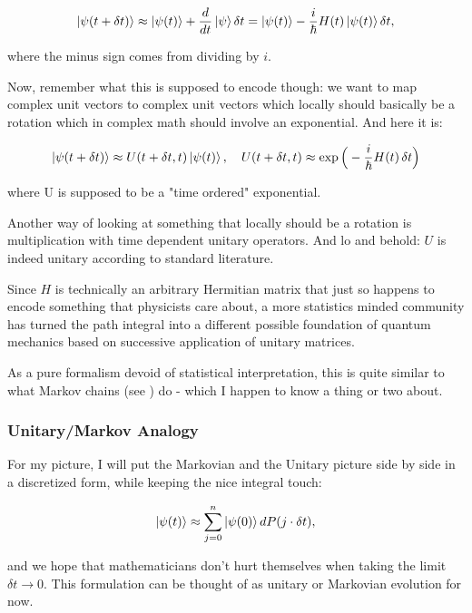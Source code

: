 \documentclass{article}
\begin{document}
\begin{align*}
\ket{\psi(t+\delta t)}\approx \ket{\psi(t)}+\frac{d}{dt}\ket{\psi}\delta t=\ket{\psi(t)}-\frac{i}{\hbar}H(t)\ket{\psi(t)}\delta t,
\end{align*}

where the minus sign comes from dividing by $i$.

Now, remember what this is supposed to encode though: we want to map complex unit vectors to complex unit vectors which locally should basically be a rotation which in complex math should involve an exponential. And here it is:

\begin{align*}
\ket{\psi(t+\delta t)} \approx U(t+\delta t, t) \ket{\psi(t)}, \quad
U(t+\delta t, t) \approx \exp\Big(-\frac{i}{\hbar} H(t)\, \delta t \Big)
\end{align*}

where U is supposed to be a "time ordered" exponential.

Another way of looking at something that locally should be a rotation is multiplication with time dependent unitary operators. And lo and behold: $U$ is indeed unitary according to standard literature.

Since $H$ is technically an arbitrary Hermitian matrix that just so happens to encode something that physicists care about, a more statistics minded community has turned the path integral into a different possible foundation \cite{Luty2007PathIntegrals} of quantum mechanics based on successive application of unitary matrices.

As a pure formalism devoid of statistical interpretation, this is quite similar to what Markov chains (see \cite{LevinPeres2017}) do - which I happen to know a thing or two about.

\subsubsection{Unitary/Markov Analogy}

For my picture, I will put the Markovian and the Unitary picture side by side in a discretized form, while keeping the nice integral touch:

\begin{align*}
\ket{\psi(t)} \approx \sum_{j=0}^n \ket{\psi(0)} d P(j\cdot\delta t),
\end{align*}

and we hope that mathematicians don't hurt themselves when taking the limit $\delta t \to 0$. This formulation can be thought of as unitary or Markovian evolution for now.
\end{document}
